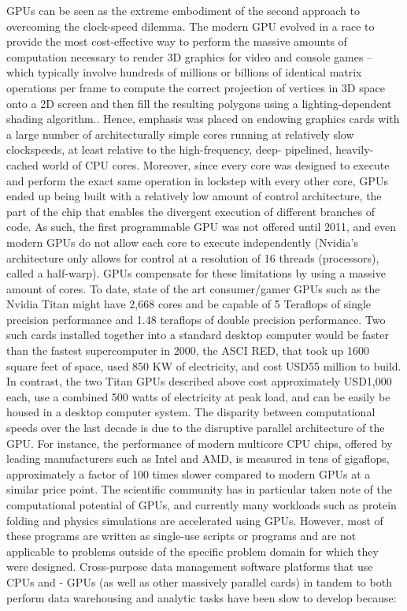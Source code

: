 \documentclass[twocolumn]{article}
\begin{document}
GPUs can be seen as the extreme embodiment of the second approach to overcoming the clock-speed dilemma. The modern GPU evolved in a race to provide the most cost-effective way to perform the massive amounts of computation necessary to render 3D graphics for video and console games – which typically involve hundreds of millions or billions of identical matrix operations per frame to compute the correct projection of vertices in 3D space onto a 2D screen and then fill the resulting polygons using a lighting-dependent shading algorithm.. Hence, emphasis was placed on endowing graphics cards with a large number of architecturally simple cores running at relatively slow clockspeeds, at least relative to the high-frequency, deep- pipelined, heavily-cached world of CPU cores. Moreover, since every core was designed to execute and perform the exact same operation in lockstep with every other core, GPUs ended up being built with a relatively low amount of control architecture, the part of the chip that enables the divergent execution of different branches of code. As such, the first programmable GPU was not offered until 2011, and even modern GPUs do not allow each core to execute independently (Nvidia’s architecture only allows for control at a resolution of 16 threads (processors), called a half-warp).
GPUs compensate for these limitations by using a massive amount of cores. To date, state of the art consumer/gamer GPUs such as the Nvidia Titan might have 2,668 cores and be capable of 5 Teraflops of single precision performance and 1.48 teraflops of double precision performance. Two such cards installed together into a standard desktop computer would be faster than the fastest supercomputer in 2000, the ASCI RED, that took up 1600 square feet of space, used 850 KW of electricity, and cost USD55 million to build. In contrast, the two Titan GPUs described above cost approximately USD1,000 each, use a combined 500 watts of electricity at peak load, and can be easily be housed in a desktop computer system. The disparity between computational speeds over the last decade is due to the disruptive parallel architecture of the GPU. For instance, the performance of modern multicore CPU chips, offered by leading manufacturers such as Intel and AMD, is measured in tens of gigaflops, approximately a factor of 100 times slower compared to modern GPUs at a similar price point.
The scientific community has in particular taken note of the computational potential of GPUs, and currently many workloads such as protein folding and physics simulations are
accelerated using GPUs. However, most of these programs are written as single-use scripts or programs and are not applicable to problems outside of the specific problem domain for which they were designed. Cross-purpose data management software platforms that use CPUs and - GPUs (as well as other massively parallel cards) in tandem to both perform data warehousing and analytic tasks have been slow to develop because:
\end{document}
